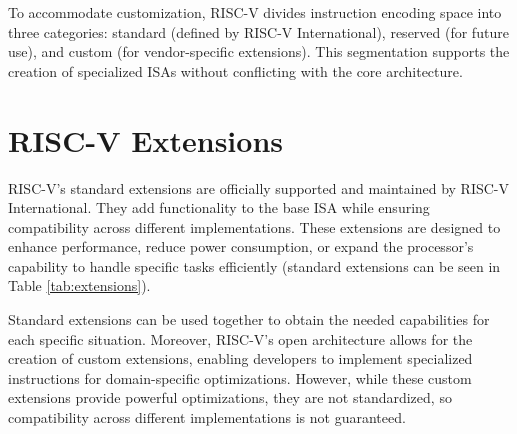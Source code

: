 To accommodate customization, RISC-V divides instruction encoding space into three
categories: standard (defined by RISC-V International), reserved (for future use),
and custom (for vendor-specific extensions). This segmentation supports the creation
of specialized ISAs without conflicting with the core architecture.

\section{RISC-V Extensions}
\label{sec:riscv_extensions}

RISC-V’s standard extensions are officially supported and maintained by RISC-V
International. They add functionality to the base ISA while ensuring compatibility
across different implementations. These extensions are designed to enhance
performance, reduce power consumption, or expand the processor's capability to
handle specific tasks efficiently (standard extensions can be seen in Table \ref{tab:extensions}).

Standard extensions can be used together to obtain the needed capabilities for
each specific situation. Moreover, RISC-V’s open architecture allows for the
creation of custom extensions, enabling developers to implement specialized instructions
for domain-specific optimizations. However, while these custom extensions provide
powerful optimizations, they are not standardized, so compatibility across different
implementations is not guaranteed.

